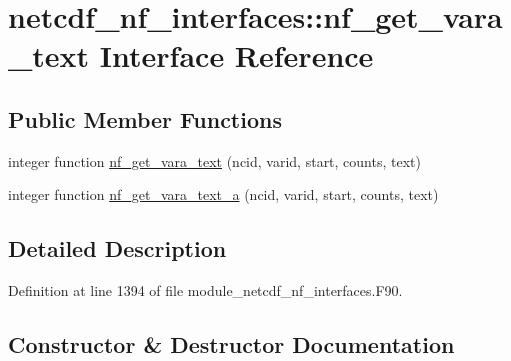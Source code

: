 \hypertarget{interfacenetcdf__nf__interfaces_1_1nf__get__vara__text}{}\section{netcdf\+\_\+nf\+\_\+interfaces\+:\+:nf\+\_\+get\+\_\+vara\+\_\+text Interface Reference}
\label{interfacenetcdf__nf__interfaces_1_1nf__get__vara__text}
\subsection*{Public Member Functions}
\begin{DoxyCompactItemize}
\item 
integer function \hyperlink{interfacenetcdf__nf__interfaces_1_1nf__get__vara__text_a77d869cc47b35fe830f4590a0994d078}{nf\+\_\+get\+\_\+vara\+\_\+text} (ncid, varid, start, counts, text)
\item 
integer function \hyperlink{interfacenetcdf__nf__interfaces_1_1nf__get__vara__text_a334e07d2b108664bbc9265478b35eb04}{nf\+\_\+get\+\_\+vara\+\_\+text\+\_\+a} (ncid, varid, start, counts, text)
\end{DoxyCompactItemize}


\subsection{Detailed Description}


Definition at line 1394 of file module\+\_\+netcdf\+\_\+nf\+\_\+interfaces.\+F90.



\subsection{Constructor \& Destructor Documentation}
\mbox{\label{interfacenetcdf__nf__interfaces_1_1nf__get__vara__text_a77d869cc47b35fe830f4590a0994d078}} 
